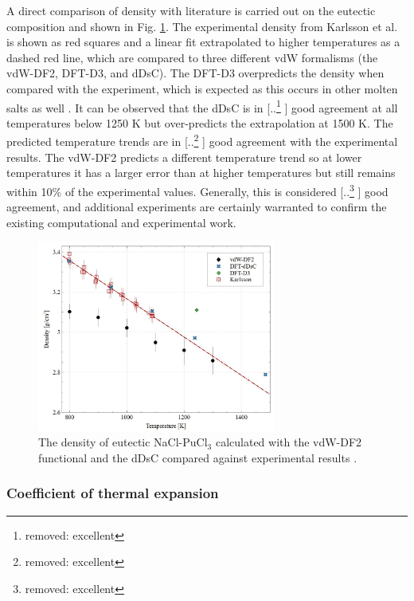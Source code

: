 \documentclass[review]{elsarticle}
\providecommand{\DIFaddtex}[1]{{\protect\color{blue} \sf #1}} %
\providecommand{\DIFdeltex}[1]{{\protect\color{red} [..\footnote{removed: #1} ]}} %
\providecommand{\DIFaddbegin}{} %
\providecommand{\DIFaddend}{} %
\providecommand{\DIFdelbegin}{} %
\providecommand{\DIFdelend}{} %
\providecommand{\DIFadd}[1]{\texorpdfstring{\DIFaddtex{#1}}{#1}} %
\providecommand{\DIFdel}[1]{\texorpdfstring{\DIFdeltex{#1}}{}} %
\newcommand{\DIFscaledelfig}{0.5}
\newlength{\DIFdelgraphicswidth} %
\newlength{\DIFdelgraphicsheight} %
\newcommand{\DIFaddincludegraphics}[2][]{{\color{blue}\fbox{\DIFOincludegraphics[#1]{#2}}}} %
\newcommand{\DIFdelincludegraphics}[2][]{%
\sbox{\DIFdelgraphicsbox}{\DIFOincludegraphics[#1]{#2}}%
\settoboxwidth{\DIFdelgraphicswidth}{\DIFdelgraphicsbox} %
\settoboxtotalheight{\DIFdelgraphicsheight}{\DIFdelgraphicsbox} %
\scalebox{\DIFscaledelfig}{%
\parbox[b]{\DIFdelgraphicswidth}{\usebox{\DIFdelgraphicsbox}\\[-\baselineskip] \rule{\DIFdelgraphicswidth}{0em}}\llap{\resizebox{\DIFdelgraphicswidth}{\DIFdelgraphicsheight}{%
\setlength{\unitlength}{\DIFdelgraphicswidth}%
\begin{picture}(1,1)%
\thicklines\linethickness{2pt} %
{\color[rgb]{1,0,0}\put(0,0){\framebox(1,1){}}}%
{\color[rgb]{1,0,0}\put(0,0){\line( 1,1){1}}}%
{\color[rgb]{1,0,0}\put(0,1){\line(1,-1){1}}}%
\end{picture}%
}\hspace*{3pt}}} %
} %
\DeclareRobustCommand{\DIFaddbegin}{\DIFOaddbegin \let\includegraphics\DIFaddincludegraphics} %
\DeclareRobustCommand{\DIFaddend}{\DIFOaddend \let\includegraphics\DIFOincludegraphics} %
\DeclareRobustCommand{\DIFdelbegin}{\DIFOdelbegin \let\includegraphics\DIFdelincludegraphics} %
\DeclareRobustCommand{\DIFdelend}{\DIFOaddend \let\includegraphics\DIFOincludegraphics} %
\begin{document}
A direct comparison of density with literature is carried out on the eutectic composition and shown in Fig. \ref{fig:eutectic_density}. The experimental density from Karlsson et al. \cite{karlsson2022synthesis} is shown as red squares and a linear fit extrapolated to higher temperatures as a dashed red line, which are compared to three different vdW formalisms (the vdW-DF2, DFT-D3, and dDsC). The DFT-D3 overpredicts the density when compared with the experiment, which is expected as this occurs in other molten salts as well \cite{duemmler_liclkcl, duemmler_naclmgcl}. It can be observed that the dDsC is in \DIFdelbegin \DIFdel{excellent }\DIFdelend \DIFaddbegin \DIFadd{good }\DIFaddend agreement at all temperatures below 1250 K but over-predicts the extrapolation at 1500 K.  The predicted temperature trends are in \DIFdelbegin \DIFdel{excellent }\DIFdelend \DIFaddbegin \DIFadd{good }\DIFaddend agreement with the experimental results. The vdW-DF2 predicts a different temperature trend so at lower temperatures it has a larger error than at higher temperatures but still remains within 10\% of the experimental values. Generally, this is considered \DIFdelbegin \DIFdel{excellent }\DIFdelend \DIFaddbegin \DIFadd{good }\DIFaddend agreement, and additional experiments are certainly warranted to confirm the existing computational and experimental work.

\begin{figure}[h!]
\centering
\includegraphics[width=0.7\textwidth]{density_comp.jpg}
\caption{The density of eutectic NaCl-PuCl$_3$ calculated with the vdW-DF2 functional and the dDsC compared against experimental results \cite{karlsson2022synthesis}.}
\label{fig:eutectic_density}
\end{figure}

\subsubsection{Coefficient of thermal expansion}
\end{document}
